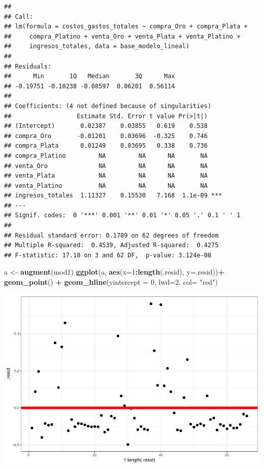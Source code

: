 \documentclass[
  11pt,
  a4paper,
]{book}
\newenvironment{Shaded}{\begin{snugshade}}{\end{snugshade}}
\newcommand{\DataTypeTok}[1]{\textcolor[rgb]{0.13,0.29,0.53}{#1}}
\newcommand{\DecValTok}[1]{\textcolor[rgb]{0.00,0.00,0.81}{#1}}
\newcommand{\KeywordTok}[1]{\textcolor[rgb]{0.13,0.29,0.53}{\textbf{#1}}}
\newcommand{\NormalTok}[1]{#1}
\newcommand{\OperatorTok}[1]{\textcolor[rgb]{0.81,0.36,0.00}{\textbf{#1}}}
\newcommand{\StringTok}[1]{\textcolor[rgb]{0.31,0.60,0.02}{#1}}
\begin{document}
\begin{verbatim}
## 
## Call:
## lm(formula = costos_gastos_totales ~ compra_Oro + compra_Plata + 
##     compra_Platino + venta_Oro + venta_Plata + venta_Platino + 
##     ingresos_totales, data = base_modelo_lineal)
## 
## Residuals:
##      Min       1Q   Median       3Q      Max 
## -0.19751 -0.10238 -0.08597  0.06201  0.56114 
## 
## Coefficients: (4 not defined because of singularities)
##                  Estimate Std. Error t value Pr(>|t|)    
## (Intercept)       0.02387    0.03855   0.619    0.538    
## compra_Oro       -0.01201    0.03696  -0.325    0.746    
## compra_Plata      0.01249    0.03695   0.338    0.736    
## compra_Platino         NA         NA      NA       NA    
## venta_Oro              NA         NA      NA       NA    
## venta_Plata            NA         NA      NA       NA    
## venta_Platino          NA         NA      NA       NA    
## ingresos_totales  1.11327    0.15530   7.168  1.1e-09 ***
## ---
## Signif. codes:  0 '***' 0.001 '**' 0.01 '*' 0.05 '.' 0.1 ' ' 1
## 
## Residual standard error: 0.1789 on 62 degrees of freedom
## Multiple R-squared:  0.4539, Adjusted R-squared:  0.4275 
## F-statistic: 17.18 on 3 and 62 DF,  p-value: 3.124e-08
\end{verbatim}

\begin{Shaded}
\begin{Highlighting}[]
\NormalTok{a <-}\StringTok{ }\KeywordTok{augment}\NormalTok{(mod1)}
\KeywordTok{ggplot}\NormalTok{(a, }\KeywordTok{aes}\NormalTok{(}\DataTypeTok{x=}\DecValTok{1}\OperatorTok{:}\KeywordTok{length}\NormalTok{(.resid), }\DataTypeTok{y=}\NormalTok{.resid))}\OperatorTok{+}
\StringTok{  }\KeywordTok{geom_point}\NormalTok{() }\OperatorTok{+}\StringTok{ }
\StringTok{  }\KeywordTok{geom_hline}\NormalTok{(}\DataTypeTok{yintercept =} \DecValTok{0}\NormalTok{, }\DataTypeTok{lwd=}\DecValTok{2}\NormalTok{, }\DataTypeTok{col=} \StringTok{"red"}\NormalTok{)}
\end{Highlighting}
\end{Shaded}

\includegraphics{index_files/figure-latex/unnamed-chunk-12-1.pdf}
\end{document}
